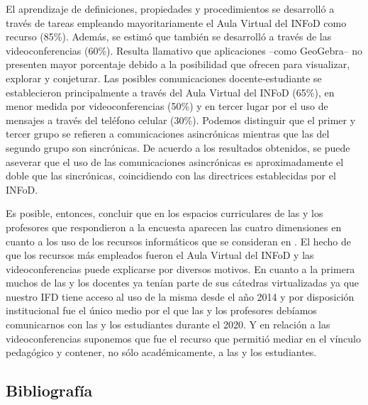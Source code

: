 El aprendizaje de definiciones, propiedades y procedimientos se desarrolló a través de tareas empleando mayoritariamente el Aula Virtual del INFoD como recurso (85\%). Además, se estimó que también se desarrolló a través de las videoconferencias (60\%). Resulta llamativo que aplicaciones --como GeoGebra-- no presenten mayor porcentaje debido a la posibilidad que ofrecen para visualizar, explorar y conjeturar. Las posibles comunicaciones docente-estudiante se establecieron principalmente a través del Aula Virtual del INFoD (65\%), en menor medida por videoconferencias (50\%) y en tercer lugar por el uso de mensajes a través del teléfono celular (30\%). Podemos distinguir que el primer y tercer grupo se refieren a comunicaciones asincrónicas mientras que las del segundo grupo son sincrónicas. De acuerdo a los resultados obtenidos, se puede aseverar que el uso de las comunicaciones asincrónicas es aproximadamente el doble que las sincrónicas, coincidiendo con las directrices establecidas por el INFoD.

Es posible, entonces, concluir que en los espacios curriculares de las y los profesores que respondieron a la encuesta aparecen las cuatro dimensiones en cuanto a los uso de los recursos informáticos que se consideran en \textcite{bravo2016}. El hecho de que los recursos más empleados fueron el Aula Virtual del INFoD y las videoconferencias puede explicarse por diversos motivos. En cuanto a la primera muchos de las y los docentes ya tenían parte de sus cátedras virtualizadas ya que nuestro IFD tiene acceso al uso de la misma desde el año 2014 y por disposición institucional fue el único medio por el que las y los profesores debíamos comunicarnos con las y los estudiantes durante el 2020. Y en relación a las videoconferencias suponemos que fue el recurso que permitió mediar en el vínculo pedagógico y contener, no sólo académicamente, a las y los estudiantes.

\subsection{Bibliografía}

\nocite{*}
\printbibliography[keyword={07}]